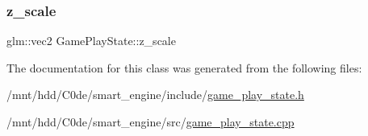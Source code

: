\mbox{\label{classGamePlayState_a9bdc2e5899e9ca4e266019f646d2ba34}} 
\subsubsection{\texorpdfstring{z\+\_\+scale}{z\_scale}}
{\footnotesize\ttfamily glm\+::vec2 Game\+Play\+State\+::z\+\_\+scale\hspace{0.3cm}{\ttfamily [private]}}



The documentation for this class was generated from the following files\+:\begin{DoxyCompactItemize}
\item 
/mnt/hdd/\+C0de/smart\+\_\+engine/include/\hyperlink{game__play__state_8h}{game\+\_\+play\+\_\+state.\+h}\item 
/mnt/hdd/\+C0de/smart\+\_\+engine/src/\hyperlink{game__play__state_8cpp}{game\+\_\+play\+\_\+state.\+cpp}\end{DoxyCompactItemize}
